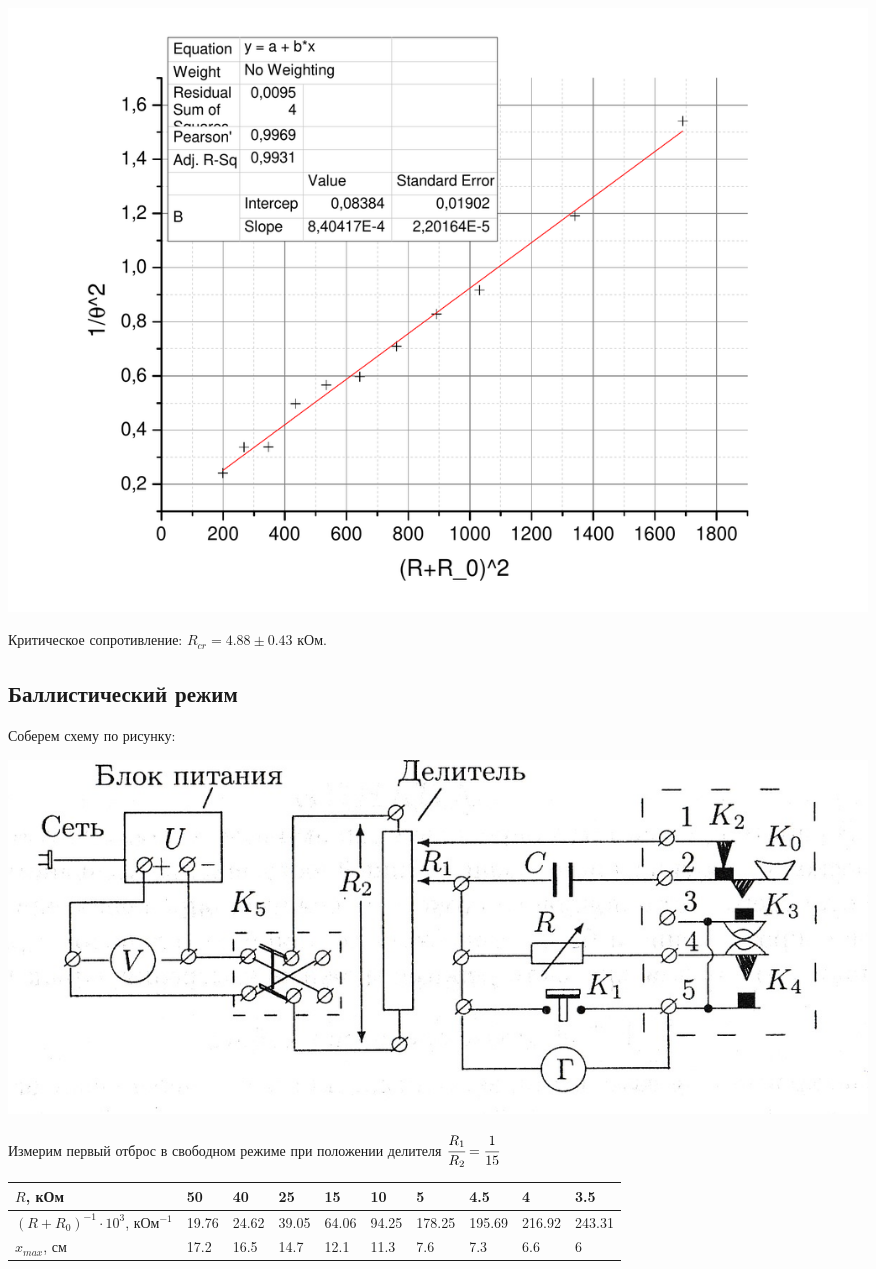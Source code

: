\documentclass[a4paper,12pt]{article}
\begin{document}
\includegraphics[width = 0.7\linewidth]{graph2}

Критическое сопротивление: $R_{cr} = 4.88\pm 0.43$ кОм.
\subsection{Баллистический режим}
	Соберем схему по рисунку: 
	\newline
	
	\includegraphics[width = 0.9\linewidth]{pic2}
	
	Измерим первый отброс в свободном режиме при положении делителя $\cfrac{R_1}{R_2} = \cfrac{1}{15}$
	

	
	\begin{table}[h]
		\begin{tabular}{|l|l|l|l|l|l|l|l|l|l|}
			\hline
			$R$, кОм& 50    & 40    & 25    & 15    & 10    & 5      & 4.5    & 4      & 3.5    \\ \hline
			$\left(R+R_0\right)^{-1}\cdot 10^3$, кОм$^{-1}$& 19.76 & 24.62 & 39.05 & 64.06 & 94.25 & 178.25 & 195.69 & 216.92 & 243.31 \\ \hline
			$ x_{max}$, см & 17.2  & 16.5  & 14.7  & 12.1  & 11.3  & 7.6    & 7.3    & 6.6    & 6      \\ \hline
		\end{tabular}
	\end{table}
	
\end{document}
